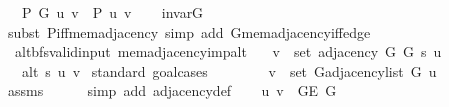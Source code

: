 \begin{isabellebody}
\ \ \ {\isachardoublequoteopen}P\ G{}\ u\ v\ {\isasymlongleftrightarrow}\ P{\isacharprime}{\kern0pt}{\isacharprime}{\kern0pt}\ {\isacharbraceleft}{\kern0pt}u{\isacharcomma}{\kern0pt}\ v{\isacharbraceright}{\kern0pt}{\isachardoublequoteclose}\isanewline
%
\isadelimproof
\ \ %
\endisadelimproof
%
\isatagproof
{}\isamarkupfalse%
\ invar{\isacharunderscore}{\kern0pt}G{}\isanewline
\ \ \isamarkupfalse%
\ {\isacharparenleft}{\kern0pt}subst\ P{\isacharunderscore}{\kern0pt}iff{\isacharunderscore}{\kern0pt}mem{\isacharunderscore}{\kern0pt}adjacency{\isacharparenright}{\kern0pt}\ {\isacharparenleft}{\kern0pt}simp\ add{\isacharcolon}{\kern0pt}\ G{}{\isachardot}{\kern0pt}mem{\isacharunderscore}{\kern0pt}adjacency{\isacharunderscore}{\kern0pt}iff{\isacharunderscore}{\kern0pt}edge{\isacharparenright}{\kern0pt}{\isacharplus}{\kern0pt}%
\endisatagproof
{\isafoldproof}%
%
\isadelimproof
\isanewline
%
\endisadelimproof
\isanewline
{}\isamarkupfalse%
\ {\isacharparenleft}{\kern0pt}\ alt{\isacharunderscore}{\kern0pt}bfs{\isacharunderscore}{\kern0pt}valid{\isacharunderscore}{\kern0pt}input{\isacharparenright}{\kern0pt}\ mem{\isacharunderscore}{\kern0pt}adjacency{\isacharunderscore}{\kern0pt}imp{\isacharunderscore}{\kern0pt}alt{\isacharcolon}{\kern0pt}\isanewline
\ \ \ {\isachardoublequoteopen}v\ {\isasymin}\ set\ {\isacharparenleft}{\kern0pt}adjacency\ G{}\ G{}\ s\ u{\isacharparenright}{\kern0pt}{\isachardoublequoteclose}\isanewline
\ \ \ {\isachardoublequoteopen}alt\ s\ u\ v{\isachardoublequoteclose}\isanewline
%
\isadelimproof
%
\endisadelimproof
%
\isatagproof
{}\isamarkupfalse%
\ {\isacharparenleft}{\kern0pt}standard{\isacharcomma}{\kern0pt}\ goal{\isacharunderscore}{\kern0pt}cases{\isacharparenright}{\kern0pt}\isanewline
\ \ \isamarkupfalse%
\ {}\isanewline
\ \ \isamarkupfalse%
\ {\isachardoublequoteopen}v\ {\isasymin}\ set\ {\isacharparenleft}{\kern0pt}G{\isachardot}{\kern0pt}adjacency{\isacharunderscore}{\kern0pt}list\ G{}\ u{\isacharparenright}{\kern0pt}{\isachardoublequoteclose}\isanewline
\ \ \ \ \isamarkupfalse%
\ assms\isanewline
\ \ \ \ \isamarkupfalse%
\ {\isacharparenleft}{\kern0pt}simp\ add{\isacharcolon}{\kern0pt}\ adjacency{\isacharunderscore}{\kern0pt}def{\isacharparenright}{\kern0pt}\isanewline
\ \ \isamarkupfalse%
\ {\isachardoublequoteopen}{\isacharbraceleft}{\kern0pt}u{\isacharcomma}{\kern0pt}\ v{\isacharbraceright}{\kern0pt}\ {\isasymin}\ G{\isachardot}{\kern0pt}E\ G{}{\isachardoublequoteclose}\isanewline

\end{isabellebody}
